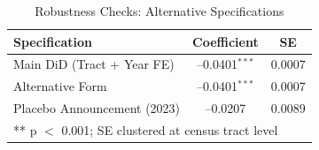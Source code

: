 \begin{table}[h]
\centering
\caption{Robustness Checks: Alternative Specifications}
\label{table:robustness}
\begin{tabular}{lcc}
\toprule
Specification & Coefficient & SE \\
\midrule
Main DiD (Tract + Year FE) & --0.0401$^{***}$ & 0.0007 \\
Alternative Form & --0.0401$^{***}$ & 0.0007 \\
Placebo Announcement (2023) & --0.0207 & 0.0089 \\
\bottomrule
\multicolumn{3}{l}{\footnotesize *** p $<$ 0.001; SE clustered at census tract level}
\end{tabular}
\end{table}
